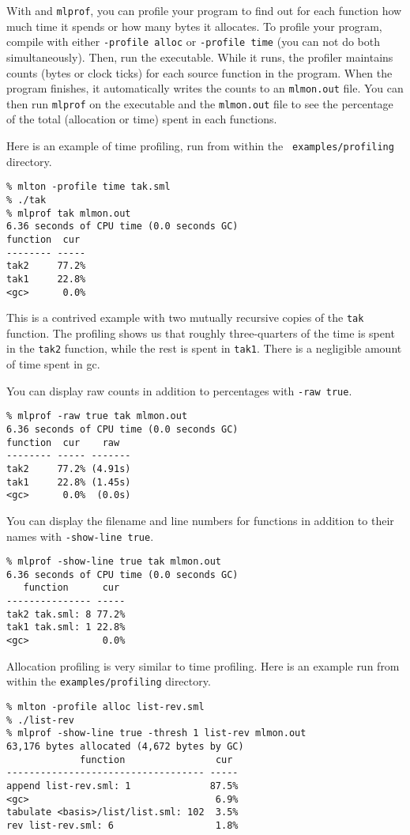 
With {\mlton} and {\tt mlprof}, you can profile your program to find
out for each function how much time it spends or how many bytes it
allocates.  To profile your program, compile with either {\tt -profile
alloc} or {\tt -profile time} (you can not do both simultaneously).
Then, run the executable.  While it runs, the profiler maintains
counts (bytes or clock ticks) for each source function in the program.
When the program finishes, it automatically writes the counts to an
{\tt mlmon.out} file.  You can then run {\tt mlprof} on the executable
and the {\tt mlmon.out} file to see the percentage of the total
(allocation or time) spent in each functions.

Here is an example of time profiling, run from within the {\tt
examples/profiling} directory.
\begin{verbatim}
% mlton -profile time tak.sml
% ./tak
% mlprof tak mlmon.out
6.36 seconds of CPU time (0.0 seconds GC)
function  cur 
-------- -----
tak2     77.2%
tak1     22.8%
<gc>      0.0%
\end{verbatim}
This is a contrived example with two mutually recursive copies of the
{\tt tak} function.  The profiling shows us that roughly
three-quarters of the time is spent in the {\tt tak2} function, while
the rest is spent in {\tt tak1}.  There is a negligible amount of time
spent in gc.

You can display raw counts in addition to percentages with {\tt -raw
true}.
\begin{verbatim}
% mlprof -raw true tak mlmon.out
6.36 seconds of CPU time (0.0 seconds GC)
function  cur    raw  
-------- ----- -------
tak2     77.2% (4.91s)
tak1     22.8% (1.45s)
<gc>      0.0%  (0.0s)
\end{verbatim}

You can display the filename and line numbers for functions in addition
to their names with {\tt -show-line true}.
\begin{verbatim}
% mlprof -show-line true tak mlmon.out
6.36 seconds of CPU time (0.0 seconds GC)
   function      cur 
--------------- -----
tak2 tak.sml: 8 77.2%
tak1 tak.sml: 1 22.8%
<gc>             0.0%
\end{verbatim}

Allocation profiling is very similar to time profiling.  Here is an
example run from within the {\tt examples/profiling} directory.

\begin{verbatim}
% mlton -profile alloc list-rev.sml
% ./list-rev
% mlprof -show-line true -thresh 1 list-rev mlmon.out
63,176 bytes allocated (4,672 bytes by GC)
             function                cur 
----------------------------------- -----
append list-rev.sml: 1              87.5%
<gc>                                 6.9%
tabulate <basis>/list/list.sml: 102  3.5%
rev list-rev.sml: 6                  1.8%
\end{verbatim}

